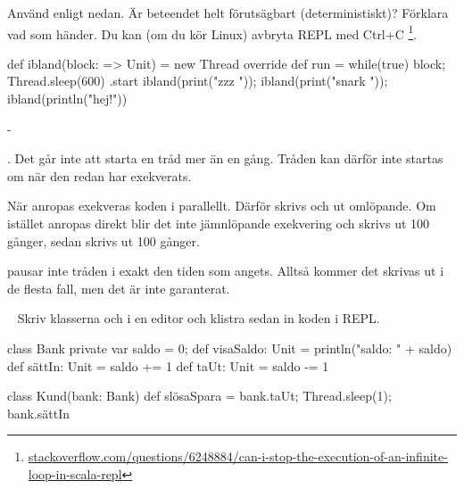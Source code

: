 \Subtask Använd  enligt nedan. Är beteendet helt förutsägbart (deterministiskt)? Förklara vad som händer. Du kan (om du kör Linux) avbryta REPL med Ctrl+C%
\footnote{\href{http://stackoverflow.com/questions/6248884/can-i-stop-the-execution-of-an-infinite-loop-in-scala-repl}{stackoverflow.com/questions/6248884/can-i-stop-the-execution-of-an-infinite-loop-in-scala-repl}}.
\begin{REPL}
def ibland(block: => Unit) = new Thread {
  override def run = while(true) { block; Thread.sleep(600) }
}.start
ibland(print("zzz ")); ibland(print("snark ")); ibland(println("hej!"))
\end{REPL}


\SOLUTION


\TaskSolved \what

\SubtaskSolved   -

\SubtaskSolved  {}. Det går inte att starta en tråd mer än en gång. Tråden kan därför inte startas om när den redan har exekverats.

\SubtaskSolved   När  anropas exekveras koden i  parallellt. Därför skrivs  och  ut omlöpande. Om istället  anropas direkt blir det inte jämnlöpande exekvering och  skrivs ut 100 gånger, sedan skrivs  ut 100 gånger.

\SubtaskSolved   {} pausar inte tråden i exakt den tiden som angets. Alltså kommer det skrivas ut  i de flesta fall, men det är inte garanterat.



\QUESTEND







\QUESTBEGIN

\Task \label{task:racecondition} \what~   Skriv klasserna  och  i en editor och klistra sedan in koden i REPL.

\begin{Code}
class Bank {
  private var saldo = 0;
  def visaSaldo: Unit = println("saldo: " + saldo)
  def sättIn: Unit = { saldo += 1 }
  def taUt: Unit   = { saldo -= 1 }
}

class Kund(bank: Bank) {
  def slösaSpara = {bank.taUt; Thread.sleep(1); bank.sättIn}
}
\end{Code}

